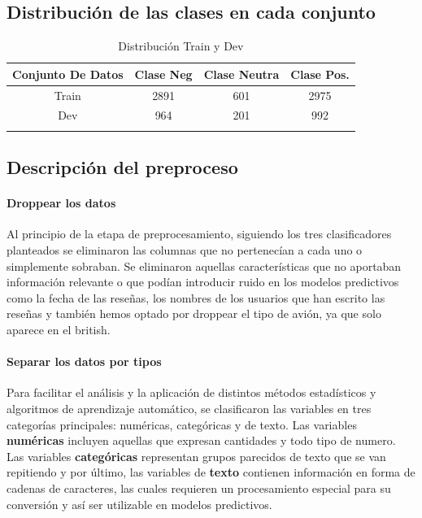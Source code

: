 \documentclass{report}
\begin{document}
            \subsection{Distribución de las clases en cada conjunto}
                \begin{longtable}{|c|c|c|c|}
                \hline
                \textbf{Conjunto De Datos} & \textbf{Clase Neg} & \textbf{Clase Neutra}  & \textbf{Clase Pos.} \\ 
                \hline
                Train & {2891} & {601} & {2975}\\ 
                \hline
                Dev & {964} & {201} & {992}\\ 
                \hline
                \caption{Distribución Train y Dev}
                \end{longtable}
            \clearpage\subsection{Descripción del preproceso} {
                \paragraph*{Droppear los datos} {
                     Al principio de la etapa de preprocesamiento, siguiendo los tres clasificadores planteados se eliminaron las columnas que no pertenecían a cada uno o simplemente sobraban. Se eliminaron aquellas características que no aportaban información relevante o que podían introducir ruido en los modelos predictivos como la fecha de las reseñas, los nombres de los usuarios que han escrito las reseñas y también hemos optado por droppear el tipo de avión, ya que solo aparece en el british.}
                \paragraph*{Separar los datos por tipos} {
                    Para facilitar el análisis y la aplicación de distintos métodos estadísticos y algoritmos de aprendizaje automático, se clasificaron las variables en tres categorías principales: numéricas, categóricas y de texto. Las variables \textbf{numéricas} incluyen aquellas que expresan cantidades y todo tipo de numero. Las variables \textbf{categóricas} representan grupos parecidos de texto que se van repitiendo y por último, las variables de \textbf{texto} contienen información en forma de cadenas de caracteres, las cuales requieren un procesamiento especial para su conversión y así ser utilizable en modelos predictivos. }
}
\end{document}
